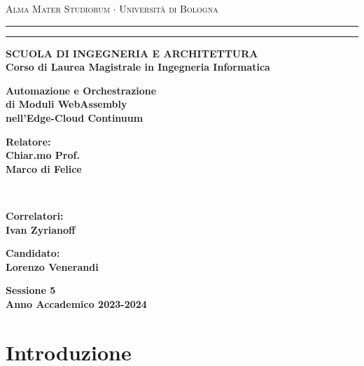 \documentclass[12pt]{report}
\begin{document}
\begin{titlepage}
\begin{center}
{{\Large{\textsc{Alma Mater Studiorum $\cdot$ Universit\`a di
Bologna}}}} \rule[0.1cm]{15.8cm}{0.1mm}
\rule[0.5cm]{15.8cm}{0.6mm}
{\small{\bf SCUOLA DI INGEGNERIA E ARCHITETTURA\\
Corso di Laurea Magistrale in Ingegneria Informatica }}
\end{center}
\vspace{15mm}
\begin{center}
{\LARGE{\bf Automazione e Orchestrazione}}\\
\vspace{5mm}
{\LARGE{\bf di Moduli WebAssembly}}\\
\vspace{4mm}
{\LARGE{\bf nell'Edge-Cloud Continuum}}\\
\end{center}
\vspace{40mm}
\par
\noindent
\begin{minipage}[t]{0.47\textwidth}
{\large{\bf Relatore:\\
Chiar.mo Prof.\\
Marco di Felice}}
\vspace{1cm}
\end{minipage}
\\
\begin{minipage}[t]{0.47\textwidth}
{\large{\bf Correlatori:\\
Ivan Zyrianoff}}

\end{minipage}
\hfill
\begin{minipage}[t]{0.47\textwidth}\raggedleft
{\large{\bf Candidato:\\
Lorenzo Venerandi}}
\end{minipage}
\vspace{20mm}
\begin{center}
{\large{\bf Sessione 5\\
Anno Accademico 2023-2024}}
\end{center}
\end{titlepage}


\myemptypage


\setcounter{page}{1}
\tableofcontents
\newpage


\chapter{Introduzione}

\end{document}
